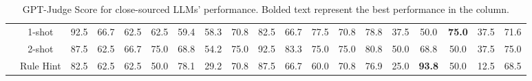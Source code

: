 \documentclass[letterpaper]{article} %
\begin{document}
\begin{table}[t]
{\begin{tabular}{lcccccccccccccccccc}
 & \cellcolor{darkpurple!25}1-shot & \cellcolor{lightpurple!25}92.5 & \cellcolor{lightpurple!25}66.7 & \cellcolor{lightpurple!25}62.5 & \cellcolor{lightpurple!25}62.5 & \cellcolor{lightpurple!25}59.4 & \cellcolor{lightpurple!25}58.3 & \cellcolor{lightpurple!25}70.8 & \cellcolor{lightpurple!25}82.5 & \cellcolor{lightpurple!25}66.7 & \cellcolor{lightpurple!25}77.5 & \cellcolor{lightpurple!25}70.8 & \cellcolor{lightpurple!25}78.8 & \cellcolor{lightpurple!25}37.5 & \cellcolor{lightpurple!25}50.0 & \cellcolor{lightpurple!25}\textbf{75.0} & \cellcolor{lightpurple!25}37.5 & \cellcolor{darkpurple!25}71.6 \\
 & \cellcolor{darkpurple!25}2-shot & \cellcolor{lightpurple!25}87.5 & \cellcolor{lightpurple!25}62.5 & \cellcolor{lightpurple!25}66.7 & \cellcolor{lightpurple!25}75.0 & \cellcolor{lightpurple!25}68.8 & \cellcolor{lightpurple!25}54.2 & \cellcolor{lightpurple!25}75.0 & \cellcolor{lightpurple!25}92.5 & \cellcolor{lightpurple!25}83.3 & \cellcolor{lightpurple!25}75.0 & \cellcolor{lightpurple!25}75.0 & \cellcolor{lightpurple!25}80.8 & \cellcolor{lightpurple!25}50.0 & \cellcolor{lightpurple!25}68.8 & \cellcolor{lightpurple!25}50.0 & \cellcolor{lightpurple!25}37.5 & \cellcolor{darkpurple!25}75.0 \\
 & \cellcolor{darkpurple!25}Rule Hint & \cellcolor{lightpurple!25}82.5 & \cellcolor{lightpurple!25}62.5 & \cellcolor{lightpurple!25}62.5 & \cellcolor{lightpurple!25}50.0 & \cellcolor{lightpurple!25}78.1 & \cellcolor{lightpurple!25}29.2 & \cellcolor{lightpurple!25}70.8 & \cellcolor{lightpurple!25}87.5 & \cellcolor{lightpurple!25}66.7 & \cellcolor{lightpurple!25}60.0 & \cellcolor{lightpurple!25}70.8 & \cellcolor{lightpurple!25}76.9 & \cellcolor{lightpurple!25}25.0 & \cellcolor{lightpurple!25}\textbf{93.8} & \cellcolor{lightpurple!25}50.0 & \cellcolor{lightpurple!25}12.5 & \cellcolor{darkpurple!25}68.5 \\
\bottomrule
\end{tabular}}
\caption{GPT-Judge Score for close-sourced LLMs' performance. Bolded text represent the best performance in the column.}
\label{tab:api_overall}
\end{table}
\end{document}
